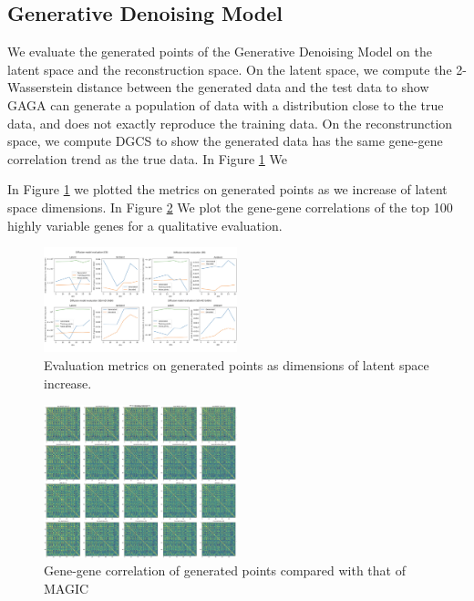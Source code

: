 \documentclass{article}
\theoremstyle{plain}
\theoremstyle{definition}
\theoremstyle{remark}
\newcommand{\methodshort}{GAGA\xspace}
\begin{document}
\subsection{Generative Denoising Model}
\par We evaluate the generated points of the Generative Denoising Model on the latent space and the reconstruction space. On the latent space, we compute the 2-Wasserstein distance between the generated data and the test data to show \methodshort can generate a population of data with a distribution close to the true data, and does not exactly reproduce the training data. On the reconstrunction space, we compute DGCS to show the generated data has the same gene-gene correlation trend as the true data. In Figure \ref{fig:dm_eval} We 
\par In Figure \ref{fig:dm_eval} we plotted the metrics on generated points as we increase of latent space dimensions. In Figure \ref{fig:gen_corr} We plot the gene-gene correlations of the top 100 highly variable genes for a qualitative evaluation.
\begin{figure}[htbp]
    \centering
    \includegraphics[width=0.5\textwidth]{fig/dm_eval.png}
    \caption{Evaluation metrics on generated points as dimensions of latent space increase.}
    \label{fig:dm_eval}
\end{figure}
\begin{figure}[htbp]
    \centering
    \includegraphics[width=0.5\textwidth]{fig/gen_corr.png}
    \caption{Gene-gene correlation of generated points compared with that of MAGIC}
    \label{fig:gen_corr}
\end{figure}
\end{document}
